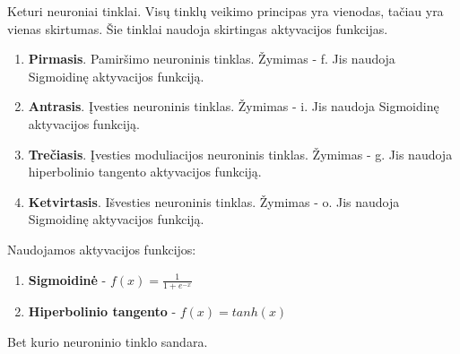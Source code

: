 Keturi neuroniai tinklai. Visų tinklų veikimo principas yra vienodas, tačiau yra vienas skirtumas. Šie tinklai naudoja skirtingas aktyvacijos funkcijas.
\begin{enumerate}
  \item \textbf{Pirmasis}. Pamiršimo neuroninis tinklas. Žymimas - f. Jis naudoja Sigmoidinę aktyvacijos funkciją.
  \item \textbf{Antrasis}. Įvesties neuroninis tinklas. Žymimas - i. Jis naudoja Sigmoidinę aktyvacijos funkciją.
  \item \textbf{Trečiasis}. Įvesties moduliacijos neuroninis tinklas. Žymimas - g. Jis naudoja hiperbolinio tangento aktyvacijos funkciją.
  \item \textbf{Ketvirtasis}. Išvesties neuroninis tinklas. Žymimas - o. Jis naudoja Sigmoidinę aktyvacijos funkciją.
\end{enumerate}

Naudojamos aktyvacijos funkcijos:
\begin{enumerate}
  \item \textbf{Sigmoidinė} - $f(x) = \frac{1}{1+e^{-x}}$
  \item \textbf{Hiperbolinio tangento} - $f(x) = tanh(x)$
\end{enumerate}

Bet kurio neuroninio tinklo sandara.
%






